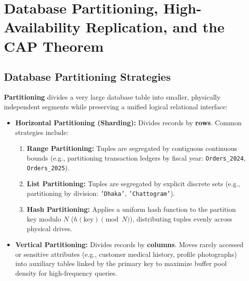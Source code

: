 \section{Database Partitioning, High-Availability Replication, and the CAP Theorem}
\label{sec:dbms_partitioning_cap}

\subsection{Database Partitioning Strategies}
\textbf{Partitioning} divides a very large database table into smaller, physically independent segments while preserving a unified logical relational interface:
\begin{itemize}
    \item \textbf{Horizontal Partitioning (Sharding):} Divides records by \textbf{rows}. Common strategies include:
    \begin{enumerate}
        \item \textbf{Range Partitioning:} Tuples are segregated by contiguous continuous bounds (e.g., partitioning transaction ledgers by fiscal year: \texttt{Orders\_2024}, \texttt{Orders\_2025}).
        \item \textbf{List Partitioning:} Tuples are segregated by explicit discrete sets (e.g., partitioning by division: \texttt{'Dhaka'}, \texttt{'Chattogram'}).
        \item \textbf{Hash Partitioning:} Applies a uniform hash function to the partition key modulo $N$ ($h(\text{key}) \pmod N$), distributing tuples evenly across physical drives.
    \end{enumerate}
    \item \textbf{Vertical Partitioning:} Divides records by \textbf{columns}. Moves rarely accessed or sensitive attributes (e.g., customer medical history, profile photographs) into auxiliary tables linked by the primary key to maximize buffer pool density for high-frequency queries.
\end{itemize}

